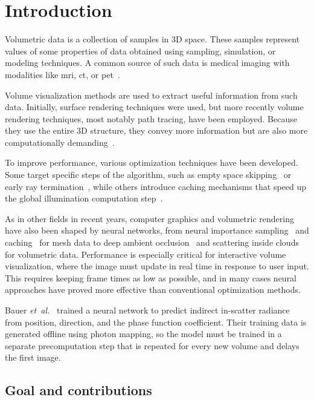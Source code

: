 \chapter{Introduction}
\label{ch:introduction}

Volumetric data is a collection of samples in 3D space. These samples
represent values of some properties of data obtained using sampling, simulation,
or modeling techniques. A common source of such data is medical imaging with
modalities like \ac{mri}, \ac{ct}, or
\ac{pet}~\cite[Sections~7.1--7.2]{kaufman_7_2005}.

Volume visualization methods are used to extract useful information from
such data. Initially, surface rendering techniques were used, but more
recently volume rendering techniques, most notably path tracing, have been
employed. Because they use the entire 3D structure, they convey more
information but are also more computationally
demanding~\cite[Section~4]{kaufman_43_2000}.

To improve performance, various optimization techniques have been developed.
Some target specific steps of the algorithm, such as empty space
skipping~\cite{hadwiger_sparseleap_2018} or early ray
termination~\cite{matsui_parallel_2005}, while others introduce caching
mechanisms that speed up the global illumination computation
step~\cite{krivanek_radiance_2008}.

As in other fields in recent years, computer graphics and volumetric
rendering have also been shaped by neural networks, from neural importance
sampling~\cite{muller_neural_2019} and caching~\cite{muller_real-time_2021}
for mesh data to deep ambient occlusion~\cite{engel_deep_2021} and
scattering inside clouds~\cite{kallweit_deep_2017} for volumetric data.
Performance is especially critical for interactive volume visualization,
where the image must update in real time in response to user input. This
requires keeping frame times as low as possible, and in many cases neural
approaches have proved more effective than conventional optimization
methods.

Bauer \emph{et~al.}~\cite{bauer_photon_2024} trained a neural network to
predict indirect in-scatter radiance from position, direction, and the phase
function coefficient. Their training data is generated offline using photon
mapping, so the model must be trained in a separate precomputation step that
is repeated for every new volume and delays the first image.

\section{Goal and contributions}

